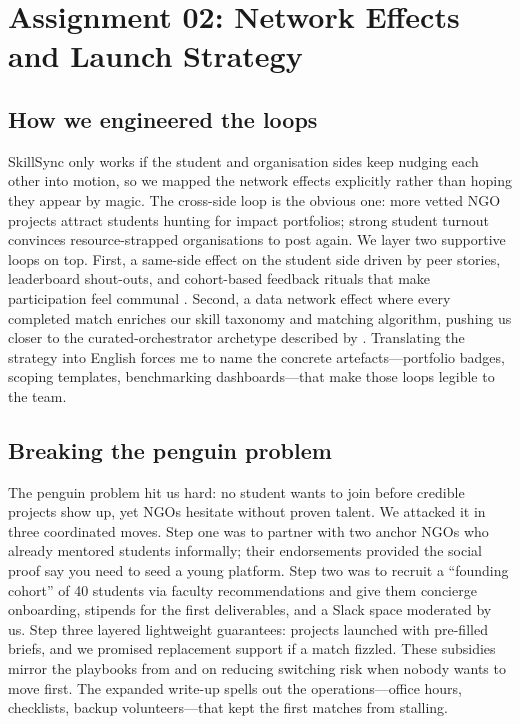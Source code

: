 \section*{Assignment 02: Network Effects and Launch Strategy}

\subsection*{How we engineered the loops}
SkillSync only works if the student and organisation sides keep nudging each other into motion, so we mapped the network effects explicitly rather than hoping they appear by magic. The cross-side loop is the obvious one: more vetted NGO projects attract students hunting for impact portfolios; strong student turnout convinces resource-strapped organisations to post again. We layer two supportive loops on top. First, a same-side effect on the student side driven by peer stories, leaderboard shout-outs, and cohort-based feedback rituals that make participation feel communal \citep{Choudary2016}. Second, a data network effect where every completed match enriches our skill taxonomy and matching algorithm, pushing us closer to the curated-orchestrator archetype described by \citet{Reillier2017}. Translating the strategy into English forces me to name the concrete artefacts---portfolio badges, scoping templates, benchmarking dashboards---that make those loops legible to the team.

\subsection*{Breaking the penguin problem}
The penguin problem hit us hard: no student wants to join before credible projects show up, yet NGOs hesitate without proven talent. We attacked it in three coordinated moves. Step one was to partner with two anchor NGOs who already mentored students informally; their endorsements provided the social proof \citet{HagiuWright2013} say you need to seed a young platform. Step two was to recruit a ``founding cohort'' of 40 students via faculty recommendations and give them concierge onboarding, stipends for the first deliverables, and a Slack space moderated by us. Step three layered lightweight guarantees: projects launched with pre-filled briefs, and we promised replacement support if a match fizzled. These subsidies mirror the playbooks from \citet{Gunasilan2024} and \citet{FarrellSaloner1986} on reducing switching risk when nobody wants to move first. The expanded write-up spells out the operations---office hours, checklists, backup volunteers---that kept the first matches from stalling.

